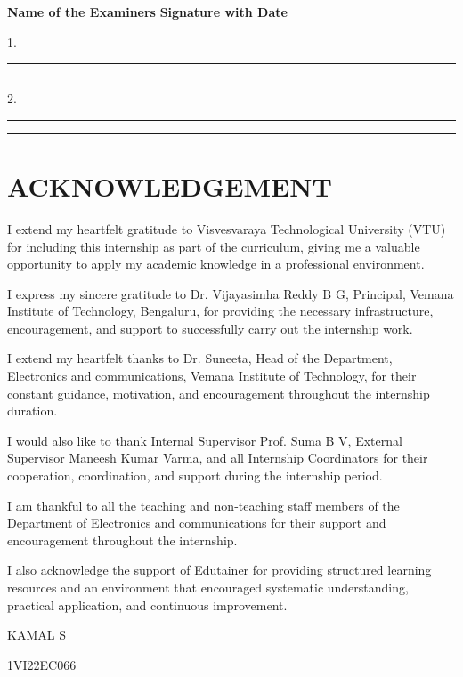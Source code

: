 \documentclass[12pt,a4paper]{report}
\begin{document}
\vspace{0.8cm}
\textbf{Name of the Examiners} \hfill \textbf{Signature with Date}\par
\vspace{0.3cm}
1.\enspace\rule{5cm}{0.4pt} \hfill \rule{3.5cm}{0.4pt}\par
\vspace{0.5cm}
2.\enspace\rule{5cm}{0.4pt} \hfill \rule{3.5cm}{0.4pt}\par



\newpage
\chapter*{ACKNOWLEDGEMENT}

I extend my heartfelt gratitude to Visvesvaraya Technological University (VTU) for including this internship as part of the curriculum, giving me a valuable opportunity to apply my academic knowledge in a professional environment.

I express my sincere gratitude to Dr. Vijayasimha Reddy B G, Principal, Vemana Institute of Technology, Bengaluru, for providing the necessary infrastructure, encouragement, and support to successfully carry out the internship work.

I extend my heartfelt thanks to Dr. Suneeta, Head of the Department, Electronics and communications, Vemana Institute of Technology, for their constant guidance, motivation, and encouragement throughout the internship duration.

I would also like to thank Internal Supervisor Prof. Suma B V, External Supervisor Maneesh Kumar Varma, and all Internship Coordinators for their cooperation, coordination, and support during the internship period.

I am thankful to all the teaching and non-teaching staff members of the Department of Electronics and communications for their support and encouragement throughout the internship.

I also acknowledge the support of Edutainer for providing structured learning resources and an environment that encouraged systematic understanding, practical application, and continuous improvement.

\vspace{0.5cm}
KAMAL S\par
1VI22EC066\par
\end{document}
